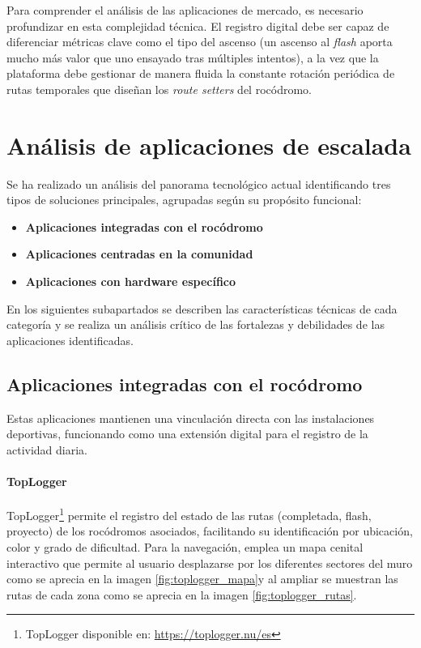 Para comprender el análisis de las aplicaciones de mercado, es necesario profundizar en esta complejidad técnica. El registro digital debe ser capaz de diferenciar métricas clave como el tipo del ascenso (un ascenso al \textit{flash} aporta mucho más valor que uno ensayado tras múltiples intentos), a la vez que la plataforma debe gestionar de manera fluida la constante rotación periódica de rutas temporales que diseñan los \textit{route setters} del rocódromo.

\section{Análisis de aplicaciones de escalada}

Se ha realizado un análisis del panorama tecnológico actual identificando tres tipos de soluciones principales, agrupadas según su propósito funcional:
\begin{itemize}
\item \textbf{Aplicaciones integradas con el rocódromo}
\item \textbf{Aplicaciones centradas en la comunidad}
\item \textbf{Aplicaciones con hardware específico} 
\end{itemize}

En los siguientes subapartados se describen las características técnicas de cada categoría y se realiza un análisis crítico de las fortalezas y debilidades de las aplicaciones identificadas.

\subsection{Aplicaciones integradas con el rocódromo}

Estas aplicaciones mantienen una vinculación directa con las instalaciones deportivas, funcionando como una extensión digital para el registro de la actividad diaria.

\paragraph{TopLogger}
TopLogger\footnote{TopLogger disponible en: \url{https://toplogger.nu/es}} permite el registro del estado de las rutas (completada, flash, proyecto) de los rocódromos asociados, facilitando su identificación por ubicación, color y grado de dificultad. Para la navegación, emplea un mapa cenital interactivo que permite al usuario desplazarse por los diferentes sectores del muro como se aprecia en la imagen \ref{fig:toplogger_mapa}y al ampliar se muestran las rutas de cada zona como se aprecia en la imagen \ref{fig:toplogger_rutas}.

